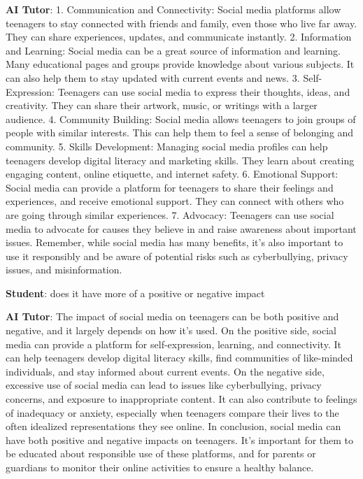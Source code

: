 \documentclass[
  11pt,
]{article}
\begin{document}
\textbf{AI Tutor}: 1. Communication and Connectivity: Social media platforms allow teenagers to stay connected with friends and family, even those who live far away. They can share experiences, updates, and communicate instantly. 2. Information and Learning: Social media can be a great source of information and learning. Many educational pages and groups provide knowledge about various subjects. It can also help them to stay updated with current events and news. 3. Self-Expression: Teenagers can use social media to express their thoughts, ideas, and creativity. They can share their artwork, music, or writings with a larger audience. 4. Community Building: Social media allows teenagers to join groups of people with similar interests. This can help them to feel a sense of belonging and community. 5. Skills Development: Managing social media profiles can help teenagers develop digital literacy and marketing skills. They learn about creating engaging content, online etiquette, and internet safety. 6. Emotional Support: Social media can provide a platform for teenagers to share their feelings and experiences, and receive emotional support. They can connect with others who are going through similar experiences. 7. Advocacy: Teenagers can use social media to advocate for causes they believe in and raise awareness about important issues. Remember, while social media has many benefits, it's also important to use it responsibly and be aware of potential risks such as cyberbullying, privacy issues, and misinformation.

\textbf{Student}: does it have more of a positive or negative impact

\textbf{AI Tutor}: The impact of social media on teenagers can be both positive and negative, and it largely depends on how it's used. On the positive side, social media can provide a platform for self-expression, learning, and connectivity. It can help teenagers develop digital literacy skills, find communities of like-minded individuals, and stay informed about current events. On the negative side, excessive use of social media can lead to issues like cyberbullying, privacy concerns, and exposure to inappropriate content. It can also contribute to feelings of inadequacy or anxiety, especially when teenagers compare their lives to the often idealized representations they see online. In conclusion, social media can have both positive and negative impacts on teenagers. It's important for them to be educated about responsible use of these platforms, and for parents or guardians to monitor their online activities to ensure a healthy balance.
\end{document}
